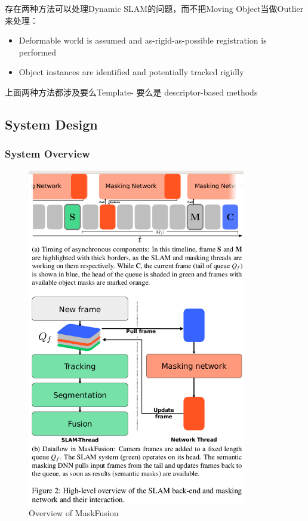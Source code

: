 存在两种方法可以处理Dynamic SLAM的问题，而不把Moving Object当做Outlier来处理：
\begin{itemize}
\item Deformable world is assumed and as-rigid-as-possible registration is performed
\item Object instances are identified and potentially tracked rigidly
\end{itemize}

上面两种方法都涉及要么Template- 要么是 descriptor-based methods

\subsection{System Design}

\subsubsection{System Overview}

\begin{figure}[!hbtp]
\centering
\includegraphics[width=0.85\textwidth]{SemanticSLAM/MaskFusion0.png}
\caption{Overview of MaskFusion}
\label{MaskFusion0}
\end{figure}

